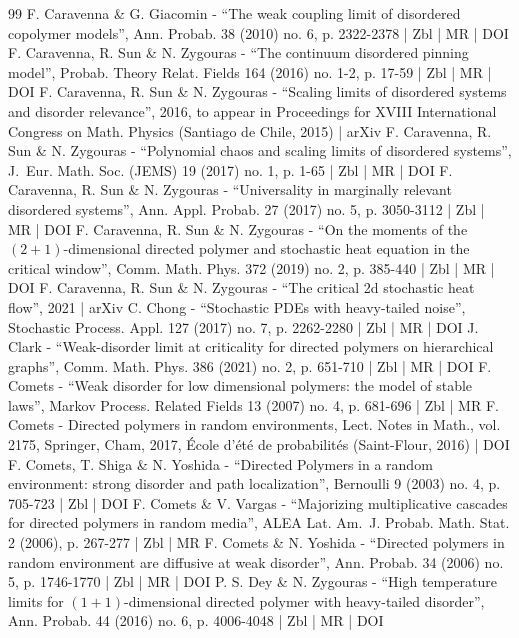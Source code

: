 \documentclass[10pt]{amsart}
\theoremstyle{definition}
\begin{document}
\begin{thebibliography}{99}
F. Caravenna \& G. Giacomin - “The weak coupling limit of disordered copolymer models”, Ann. Probab. 38 (2010) no. 6, p. 2322-2378 | Zbl | MR | DOI
F. Caravenna, R. Sun \& N. Zygouras - “The continuum disordered pinning model”, Probab. Theory Relat. Fields 164 (2016) no. 1-2, p. 17-59 | Zbl | MR | DOI
F. Caravenna, R. Sun \& N. Zygouras - “Scaling limits of disordered systems and disorder relevance”, 2016, to appear in Proceedings for XVIII International Congress on Math. Physics (Santiago de Chile, 2015) | arXiv
F. Caravenna, R. Sun \& N. Zygouras - “Polynomial chaos and scaling limits of disordered systems”, J. Eur. Math. Soc. (JEMS) 19 (2017) no. 1, p. 1-65 | Zbl | MR | DOI
F. Caravenna, R. Sun \& N. Zygouras - “Universality in marginally relevant disordered systems”, Ann. Appl. Probab. 27 (2017) no. 5, p. 3050-3112 | Zbl | MR | DOI
F. Caravenna, R. Sun \& N. Zygouras - “On the moments of the $(2+1)$-dimensional directed polymer and stochastic heat equation in the critical window”, Comm. Math. Phys. 372 (2019) no. 2, p. 385-440 | Zbl | MR | DOI
F. Caravenna, R. Sun \& N. Zygouras - “The critical 2d stochastic heat flow”, 2021 | arXiv
C. Chong - “Stochastic PDEs with heavy-tailed noise”, Stochastic Process. Appl. 127 (2017) no. 7, p. 2262-2280 | Zbl | MR | DOI
J. Clark - “Weak-disorder limit at criticality for directed polymers on hierarchical graphs”, Comm. Math. Phys. 386 (2021) no. 2, p. 651-710 | Zbl | MR | DOI
F. Comets - “Weak disorder for low dimensional polymers: the model of stable laws”, Markov Process. Related Fields 13 (2007) no. 4, p. 681-696 | Zbl | MR
F. Comets - Directed polymers in random environments, Lect. Notes in Math., vol. 2175, Springer, Cham, 2017, École d’été de probabilités (Saint-Flour, 2016) | DOI
F. Comets, T. Shiga \& N. Yoshida - “Directed Polymers in a random environment: strong disorder and path localization”, Bernoulli 9 (2003) no. 4, p. 705-723 | Zbl | DOI
F. Comets \& V. Vargas - “Majorizing multiplicative cascades for directed polymers in random media”, ALEA Lat. Am. J. Probab. Math. Stat. 2 (2006), p. 267-277 | Zbl | MR
F. Comets \& N. Yoshida - “Directed polymers in random environment are diffusive at weak disorder”, Ann. Probab. 34 (2006) no. 5, p. 1746-1770 | Zbl | MR | DOI
P. S. Dey \& N. Zygouras - “High temperature limits for $(1+ 1)$-dimensional directed polymer with heavy-tailed disorder”, Ann. Probab. 44 (2016) no. 6, p. 4006-4048 | Zbl | MR | DOI

\end{thebibliography}
\end{document}
